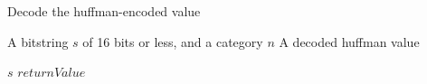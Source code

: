 \begin{algorithm}
\caption{Decode the huffman-encoded value}
\label{algDecodeHuffmanValue}
\begin{algorithmic}
\REQUIRE A bitstring $s$ of 16 bits or less, and a category $n$
\ENSURE A decoded huffman value

	\RETURN $s$
\ENDIF
{}
\RETURN $returnValue$
\end{algorithmic}
\end{algorithm}
